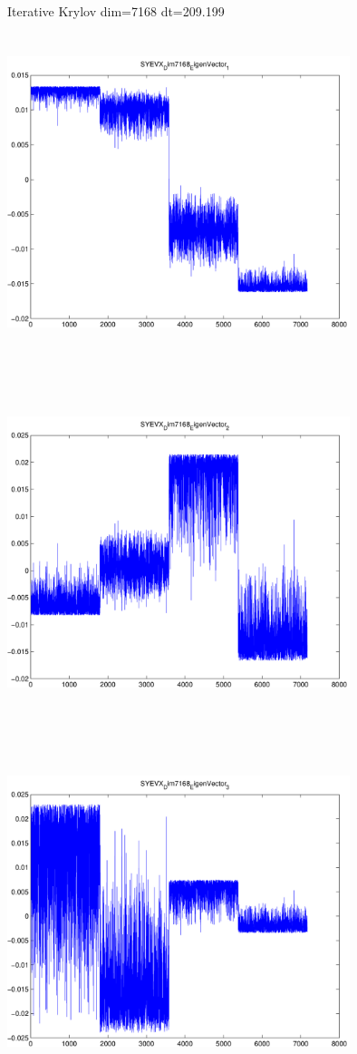 \documentclass[9pt]{article}
\theoremstyle{plain}
\theoremstyle{definition}
\theoremstyle{remark}
\numberwithin{equation}{section}
\begin{document}
Iterative Krylov dim=7168 dt=209.199
\includegraphics[width=10.0cm,height=10.0cm]{SYEVX_Dim7168_EigenVector_1.pdf}

\includegraphics[width=10.0cm,height=10.0cm]{SYEVX_Dim7168_EigenVector_2.pdf}

\includegraphics[width=10.0cm,height=10.0cm]{SYEVX_Dim7168_EigenVector_3.pdf}
\end{document}
